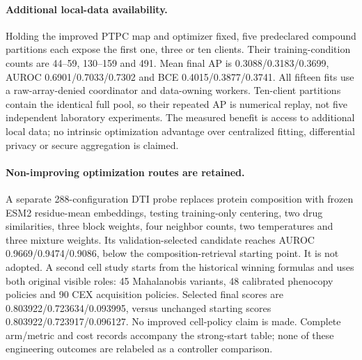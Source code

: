 \paragraph{Additional local-data availability.}
Holding the improved PTPC map and optimizer fixed, five predeclared compound partitions each expose the first one, three or ten clients. Their training-condition counts are 44--59, 130--159 and 491. Mean final AP is 0.3088/0.3183/0.3699, AUROC 0.6901/0.7033/0.7302 and BCE 0.4015/0.3877/0.3741. All fifteen fits use a raw-array-denied coordinator and data-owning workers. Ten-client partitions contain the identical full pool, so their repeated AP is numerical replay, not five independent laboratory experiments. The measured benefit is access to additional local data; no intrinsic optimization advantage over centralized fitting, differential privacy or secure aggregation is claimed.

\paragraph{Non-improving optimization routes are retained.}
A separate 288-configuration DTI probe replaces protein composition with frozen ESM2 residue-mean embeddings, testing training-only centering, two drug similarities, three block weights, four neighbor counts, two temperatures and three mixture weights. Its validation-selected candidate reaches AUROC 0.9669/0.9474/0.9086, below the composition-retrieval starting point. It is not adopted. A second cell study starts from the historical winning formulas and uses both original visible roles: 45 Mahalanobis variants, 48 calibrated phenocopy policies and 90 CEX acquisition policies. Selected final scores are 0.803922/0.723634/0.093995, versus unchanged starting scores 0.803922/0.723917/0.096127. No improved cell-policy claim is made. Complete arm/metric and cost records accompany the strong-start table; none of these engineering outcomes are relabeled as a controller comparison.
